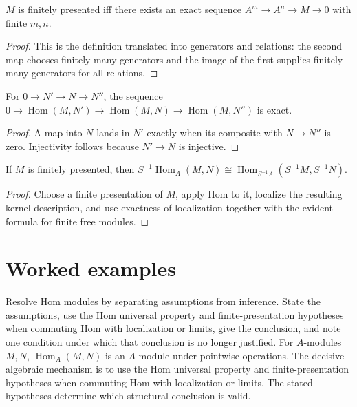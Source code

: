 \begin{theorem}\label{thm:v12-01}
$M$ is finitely presented iff there exists an exact sequence $A^m\to A^n\to M\to0$ with finite $m,n$.
\begin{proof}
This is the definition translated into generators and relations: the second map chooses finitely many generators and the image of the first supplies finitely many generators for all relations.
\end{proof}
\end{theorem}

\begin{theorem}\label{thm:v12-02}
For $0\to N'\to N\to N''$, the sequence $0\to\operatorname{Hom}(M,N')\to\operatorname{Hom}(M,N)\to\operatorname{Hom}(M,N'')$ is exact.
\begin{proof}
A map into $N$ lands in $N'$ exactly when its composite with $N\to N''$ is zero. Injectivity follows because $N'\to N$ is injective.
\end{proof}
\end{theorem}

\begin{theorem}\label{thm:v12-03}
If $M$ is finitely presented, then $S^{-1}\operatorname{Hom}_A(M,N)\cong\operatorname{Hom}_{S^{-1}A}(S^{-1}M,S^{-1}N)$.
\begin{proof}
Choose a finite presentation of $M$, apply Hom to it, localize the resulting kernel description, and use exactness of localization together with the evident formula for finite free modules.
\end{proof}
\end{theorem}

\section{Worked examples}

\begin{example}\label{ex:v12-worked-01}
Resolve Hom modules by separating assumptions from inference. State the assumptions, use the Hom universal property and finite-presentation hypotheses when commuting Hom with localization or limits, give the conclusion, and note one condition under which that conclusion is no longer justified. For $A$-modules $M,N$, $\operatorname{Hom}_A(M,N)$ is an $A$-module under pointwise operations. The decisive algebraic mechanism is to use the Hom universal property and finite-presentation hypotheses when commuting Hom with localization or limits. The stated hypotheses determine which structural conclusion is valid.
\end{example}

